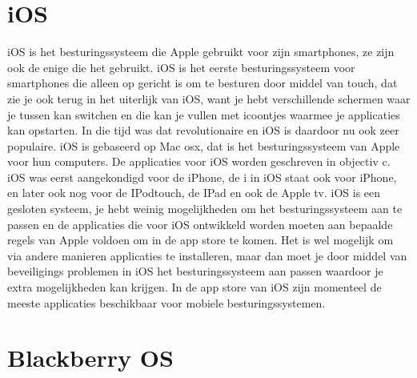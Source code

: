 \section{iOS}

iOS is het besturingssysteem die Apple gebruikt voor zijn smartphones, ze zijn ook de enige die het gebruikt. iOS is het eerste besturingssysteem voor smartphones die alleen op gericht is om te besturen door middel van touch, dat zie je ook terug in het uiterlijk van iOS, want je hebt verschillende schermen waar je tussen kan switchen en die kan je vullen met icoontjes waarmee je applicaties kan opstarten. In die tijd was dat revolutionaire en iOS is daardoor nu ook zeer populaire. iOS is gebaseerd op Mac osx, dat is het besturingssysteem van Apple voor hun computers. De applicaties voor iOS worden geschreven in objectiv c. iOS was eerst aangekondigd voor de iPhone, de i in iOS staat ook voor iPhone, en later ook nog voor de IPodtouch, de IPad en ook de Apple tv. iOS is een gesloten systeem, je hebt weinig mogelijkheden om het besturingssysteem aan te passen en de applicaties die voor iOS ontwikkeld worden moeten aan bepaalde regels van Apple voldoen om in de app store te komen. Het is wel mogelijk om via andere manieren applicaties te installeren, maar dan moet je door middel van beveiligings problemen in iOS het besturingssysteem aan passen waardoor je extra mogelijkheden kan krijgen. In de app store van iOS zijn momenteel de meeste applicaties beschikbaar voor mobiele besturingssystemen. 

\section{Blackberry OS}

